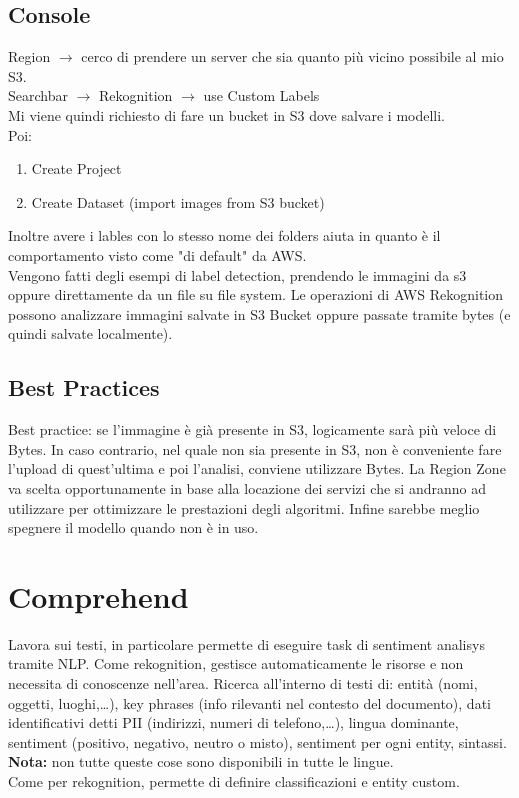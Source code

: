 \documentclass{classes/base}
\begin{document}
    \subsection*{Console}
    Region $\rightarrow$ cerco di prendere un server che sia quanto più vicino possibile al mio S3. \\
    Searchbar $\rightarrow$ Rekognition $\rightarrow$ use Custom Labels \\
    Mi viene quindi richiesto di fare un bucket in S3 dove salvare i modelli.\\
    Poi: 
    \begin{enumerate} 
        \item Create Project
        \item Create Dataset (import images from S3 bucket)
    \end{enumerate}
    Inoltre avere i lables con lo stesso nome dei folders aiuta in quanto è il comportamento visto come "di default" da AWS.\\
    Vengono fatti degli esempi di label detection, prendendo le immagini da s3 oppure direttamente da un file su file system.
    Le operazioni di AWS Rekognition possono analizzare immagini salvate in S3 Bucket oppure passate tramite bytes (e quindi salvate localmente).

    \subsection*{Best Practices}
    Best practice: se l’immagine è già presente in S3, logicamente sarà più veloce di Bytes.
    In caso contrario, nel quale non sia presente in S3, non è conveniente fare l’upload di quest’ultima e poi l’analisi, conviene utilizzare Bytes.
    La Region Zone va scelta opportunamente in base alla locazione dei servizi che si andranno ad utilizzare per ottimizzare le prestazioni degli algoritmi.
    Infine sarebbe meglio spegnere il modello quando non è in uso.

    \section*{Comprehend}
    Lavora sui testi, in particolare permette di eseguire task di sentiment analisys tramite NLP.
    Come rekognition, gestisce automaticamente le risorse e non necessita di conoscenze nell’area.
    Ricerca all’interno di testi di: entità (nomi, oggetti, luoghi,…), key phrases (info rilevanti nel contesto del documento), dati identificativi detti PII (indirizzi, numeri di telefono,…), lingua dominante, sentiment (positivo, negativo, neutro o misto), sentiment per ogni entity, sintassi. \\
    \textbf{Nota:} non tutte queste cose sono disponibili in tutte le lingue. \\
    Come per rekognition, permette di definire classificazioni e entity custom.
\end{document}
